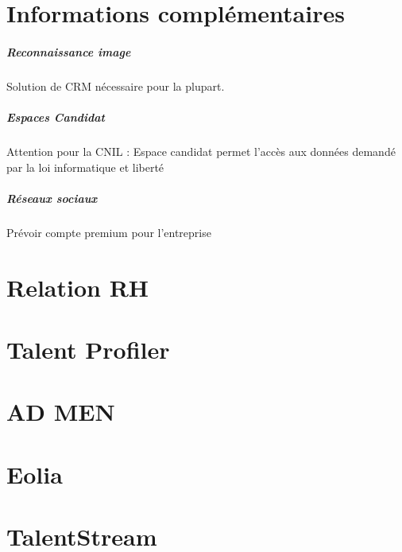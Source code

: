 \documentclass[12pt,twoside]{scrreprt}
\date{Avril 2016}
\author{Direction des opérations}
\begin{document}
\initIngeniance


% 

\tableofcontents

\chapter*{Informations complémentaires}
\paragraph{Reconnaissance image} Solution de CRM nécessaire pour la plupart.
\paragraph{Espaces Candidat} Attention pour la CNIL : Espace candidat permet l'accès aux données demandé par la loi informatique et liberté 
\paragraph{Réseaux sociaux} Prévoir compte premium pour l'entreprise

\chapter{Relation RH}


\chapter{Talent Profiler}


\chapter{AD MEN}


\chapter{Eolia}


\chapter{TalentStream}

\end{document}
